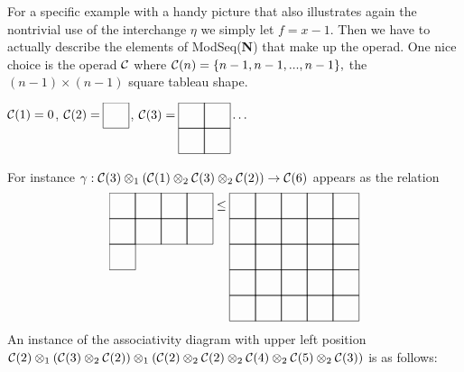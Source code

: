 \documentclass{tac}
\begin{document}
{      For a specific example with a 
      handy picture that also illustrates again the nontrivial use of the interchange $\eta$
      we simply let $f = x-1.$ Then we have to actually describe the elements of ModSeq({\bf N}) that make up the
      operad. One nice choice is the operad ${\cal C}$ where ${\cal C}(n) = \{n-1,n-1,...,n-1\},$ the  
      $(n-1)\times (n-1)$ square tableau shape. 
      
      ${\cal C}(1) = 0$, ${\cal C}(2) = \xymatrix@W=1.2pc @H=1.2pc @R=0pc @C=0pc @*[F-]{~}$, 
      ${\cal C}(3) = \xymatrix@W=1.2pc @H=1.2pc @R=0pc @C=0pc @*[F-]{~&~\\~&~} \dots$
      
      For instance $\gamma:{\cal C}(3)\otimes_1 ({\cal C}(1)\otimes_2{\cal C}(3)\otimes_2{\cal C}(2)) \to {\cal C}(6)$
      appears as the relation
      $$
      \xymatrix@W=1.2pc @H=1.2pc @R=0pc @C=0pc @*[F-]{~&~&~&~\\~&~&~&~\\~} \le \xymatrix@W=1.2pc @H=1.2pc @R=0pc @C=0pc @*[F-]{~&~&~&~&~\\~&~&~&~&~\\~&~&~&~&~\\~&~&~&~&~\\~&~&~&~&~}
      $$
      An instance of the associativity diagram with upper left position 
      ${\cal C}(2)\otimes_1({\cal C}(3)\otimes_2{\cal C}(2))\otimes_1
      ({\cal C}(2)\otimes_2{\cal C}(2)\otimes_2{\cal C}(4)\otimes_2{\cal C}(5)\otimes_2{\cal C}(3))$ is as follows:
      
}
\end{document}
